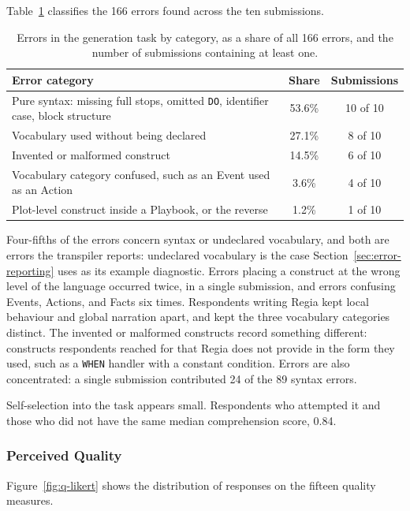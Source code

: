 Table~\ref{tab:q-errors} classifies the 166 errors found across the ten submissions.
 
\begin{table}[htpb]
\centering
\small
\begin{tabular}{|p{8.2cm}|c|c|}
\hline
\textbf{Error category} & \textbf{Share} & \textbf{Submissions} \\
\hline
Pure syntax: missing full stops, omitted \lstinline|DO|, identifier case, block structure & 53.6\% & 10 of 10 \\
Vocabulary used without being declared & 27.1\% & 8 of 10 \\
Invented or malformed construct & 14.5\% & 6 of 10 \\
Vocabulary category confused, such as an Event used as an Action & 3.6\% & 4 of 10 \\
Plot-level construct inside a Playbook, or the reverse & 1.2\% & 1 of 10 \\
\hline
\end{tabular}
\caption{Errors in the generation task by category, as a share of all 166 errors, and the number of submissions containing at least one.}
\label{tab:q-errors}
\end{table}
 
Four-fifths of the errors concern syntax or undeclared vocabulary, and both are errors the transpiler reports: undeclared vocabulary is the case Section~\ref{sec:error-reporting} uses as its example diagnostic. Errors placing a construct at the wrong level of the language occurred twice, in a single submission, and errors confusing Events, Actions, and Facts six times. Respondents writing Regia kept local behaviour and global narration apart, and kept the three vocabulary categories distinct. The invented or malformed constructs record something different: constructs respondents reached for that Regia does not provide in the form they used, such as a \lstinline|WHEN| handler with a constant condition. Errors are also concentrated: a single submission contributed 24 of the 89 syntax errors.
 
Self-selection into the task appears small. Respondents who attempted it and those who did not have the same median comprehension score, 0.84.
 
\subsubsection{Perceived Quality}
 
Figure~\ref{fig:q-likert} shows the distribution of responses on the fifteen quality measures.
 
